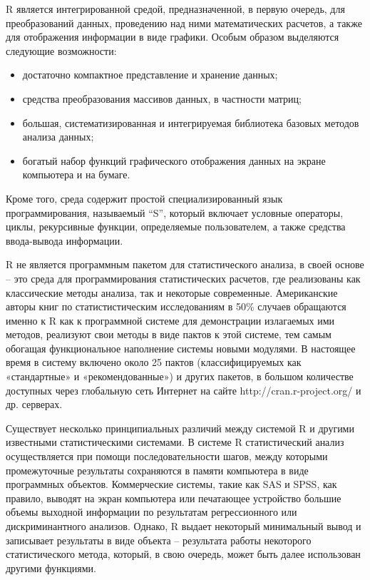 \documentclass[12pt, openany, twoside]{book} %
\begin{document}
R является интегрированной средой, предназначенной, в первую очередь, для преобразований данных, проведению над ними математических расчетов, а также для отображения информации в виде графики. Особым образом выделяются следующие возможности:
\begin{itemize}
\item достаточно компактное представление и хранение данных;
\item средства преобразования массивов данных, в частности матриц;
\item большая, систематизированная и интегрируемая библиотека базовых методов анализа данных;
\item богатый набор функций графического отображения данных на экране компьютера и на бумаге.
\end{itemize}
Кроме того, среда содержит простой специализированный язык программирования, называемый ``S'', который включает условные операторы, циклы, рекурсивные функции, определяемые пользователем, а также средства ввода-вывода информации.

R не является программным пакетом для статистического анализа, в своей основе – это среда для программирования статистических расчетов, где реализованы как классические методы анализа, так и некоторые современные. Американские авторы книг по статистистическим исследованиям в 50\% случаев обращаются именно к R как к программной системе для демонстрации излагаемых ими методов, реализуют свои методы в виде пактов к этой системе, тем самым обогащая функциональное наполнение системы новыми модулями. В настоящее время в систему  включено около 25 пактов (классифицируемых как «стандартные» и «рекомендованные») и других пакетов, в большом количестве доступных через глобальную сеть Интернет на сайте http://cran.r-project.org/ и др. серверах.

Существует несколько принципиальных различий между системой R и другими известными статистическими системами. В системе R статистический анализ осуществляется при помощи последовательности шагов, между которыми промежуточные результаты сохраняются в памяти компьютера в виде программных объектов. Коммерческие системы, такие как SAS и SPSS, как правило, выводят на экран компьютера или печатающее устройство большие объемы выходной информации по результатам регрессионного или дискриминантного анализов. Однако, R выдает некоторый минимальный вывод и записывает результаты в виде объекта – результата работы некоторого статистического метода, который, в свою очередь, может быть далее использован другими функциями.
\end{document}

